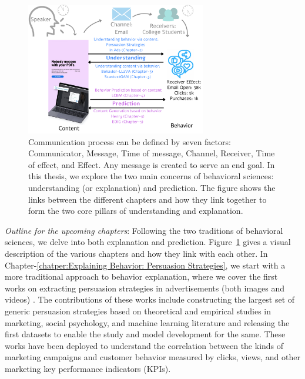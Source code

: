\begin{figure}[!t]
  \centering
  \includegraphics[width=0.7\textwidth]{images/thesis-link.pdf}
  \caption{Communication process can be defined by seven factors: Communicator, Message, Time of message, Channel, Receiver, Time of effect, and Effect. Any message is created to serve an end goal. In this thesis, we explore the two main concerns of behavioral sciences: understanding (or explanation) and prediction. The figure shows the links between the different chapters and how they link together to form the two core pillars of understanding and explanation. \label{fig:factors-of-communication-thesis-links}}
\end{figure}



\textit{Outline for the upcoming chapters}: Following the two traditions of behavioral sciences, we delve into both explanation and prediction. Figure~\ref{fig:factors-of-communication-thesis-links} gives a visual description of the various chapters and how they link with each other. In Chapter-\ref{chatper:Explaining Behavior: Persuasion Strategies}, we start with a more traditional approach to behavior explanation, where we cover the first works on extracting persuasion strategies in advertisements (both images and videos) \cite{kumar2023persuasion,bhattacharya2023video}. The contributions of these works include constructing the largest set of generic persuasion strategies based on theoretical and empirical studies in marketing, social psychology, and machine learning literature and releasing the first datasets to enable the study and model development for the same. These works have been deployed to understand the correlation between the kinds of marketing campaigns and customer behavior measured by clicks, views, and other marketing key performance indicators (KPIs). 


